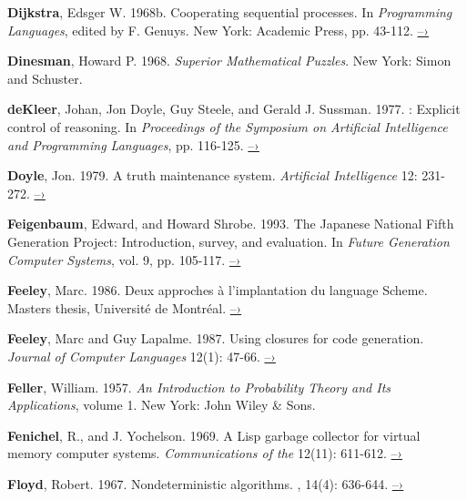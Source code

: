 { \label{Dijkstra 1968b}
\textbf{Dijkstra}, Edsger W. 1968b.  Cooperating sequential processes.  In
\textit{Programming Languages}, edited by F. Genuys. New York: Academic Press,
pp.  43-112.
\href{http://www.cs.utexas.edu/users/EWD/ewd01xx/EWD123.PDF}{–›}

 \label{Dinesman 1968}
\textbf{Dinesman}, Howard P.  1968.  \textit{Superior Mathematical
Puzzles}.  New York:
Simon and Schuster.

 \label{deKleer et al. 1977}
\textbf{deKleer}, Johan, Jon Doyle, Guy Steele, and Gerald J. Sussman.  1977.
: Explicit control of reasoning.  In \textit{Proceedings of the
 Symposium on Artificial Intelligence and Programming Languages},
pp.  116-125.
\href{http://dspace.mit.edu/handle/1721.1/5750}{–›}

 \label{Doyle (1979)}
\textbf{Doyle}, Jon. 1979. A truth maintenance system.
\textit{Artificial Intelligence}
12: 231-272.
\href{http://dspace.mit.edu/handle/1721.1/5733}{–›}

 \label{Feigenbaum and Shrobe 1993}
\textbf{Feigenbaum}, Edward, and Howard Shrobe. 1993. The Japanese
National Fifth
Generation Project: Introduction, survey, and evaluation.  In \textit{Future
Generation Computer Systems}, vol. 9, pp. 105-117.
\href{https://saltworks.stanford.edu/assets/kv359wz9060.pdf}{–›}

 \label{Feeley (1986)}
\textbf{Feeley}, Marc.  1986.  Deux approches \`a l'implantation du language
Scheme.  Masters thesis, Universit\'e de Montr\'eal.
\href{http://www.iro.umontreal.ca/~feeley/papers/FeeleyMSc.pdf}{–›}

 \label{Feeley and Lapalme 1987}
\textbf{Feeley}, Marc and Guy Lapalme.  1987.  Using closures for
code generation.
\textit{Journal of Computer Languages} 12(1): 47-66.
\href{http://citeseerx.ist.psu.edu/viewdoc/summary?doi=10.1.1.90.6978}{–›}

\textbf{Feller}, William.  1957.  \textit{An Introduction to
  Probability Theory and Its
Applications}, volume 1. New York: John Wiley \& Sons.

 \label{Fenichel and Yochelson (1969)}
\textbf{Fenichel}, R., and J. Yochelson.  1969.  A Lisp garbage
collector for virtual
memory computer systems.  \textit{Communications of the }
12(11): 611-612.
\href{https://www.cs.purdue.edu/homes/hosking/690M/p611-fenichel.pdf}{–›}

 \label{Floyd (1967)}
\textbf{Floyd}, Robert. 1967. Nondeterministic algorithms.
\textit{},
14(4): 636-644.
\href{http://citeseerx.ist.psu.edu/viewdoc/summary?doi=10.1.1.332.36}{–›}

}

